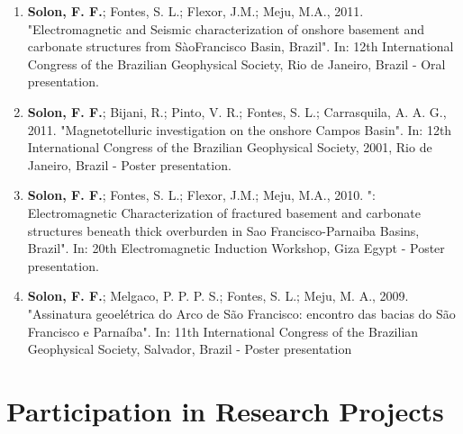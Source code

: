 \documentclass[10pt,a4paper,sans]{moderncv} %
\begin{document}
\begin{enumerate}
\item \textbf{Solon, F. F.}; Fontes, S. L.; Flexor, J.M.; Meju, M.A., 2011. "Electromagnetic and Seismic characterization of onshore basement and carbonate structures from S\`{a}oFrancisco Basin, Brazil". In: 12th International Congress of the Brazilian Geophysical Society, Rio de Janeiro, Brazil - Oral presentation.\\

\item \textbf{Solon, F. F.}; Bijani, R.; Pinto, V. R.; Fontes, S. L.; Carrasquila, A. A. G., 2011. "Magnetotelluric investigation on the onshore Campos Basin". In: 12th International Congress of the Brazilian Geophysical Society, 2001, Rio de Janeiro, Brazil - Poster presentation.\\

\item \textbf{Solon, F. F.}; Fontes, S. L.; Flexor, J.M.; Meju, M.A., 2010. ": Electromagnetic Characterization of fractured basement and carbonate structures beneath thick overburden in Sao Francisco-Parnaiba Basins, Brazil". In: 20th Electromagnetic Induction Workshop, Giza Egypt - Poster presentation.\\

\item \textbf{Solon, F. F.}; Melgaco, P. P. P. S.; Fontes, S. L.; Meju, M. A., 2009. "Assinatura geoel\'{e}trica do Arco de S\~{a}o Francisco: encontro das bacias do S\~{a}o Francisco e Parna\'{i}ba". In: 11th International Congress of the Brazilian Geophysical Society, Salvador, Brazil - Poster presentation \\

\end{enumerate}


\section{Participation in Research Projects}


\end{document}
